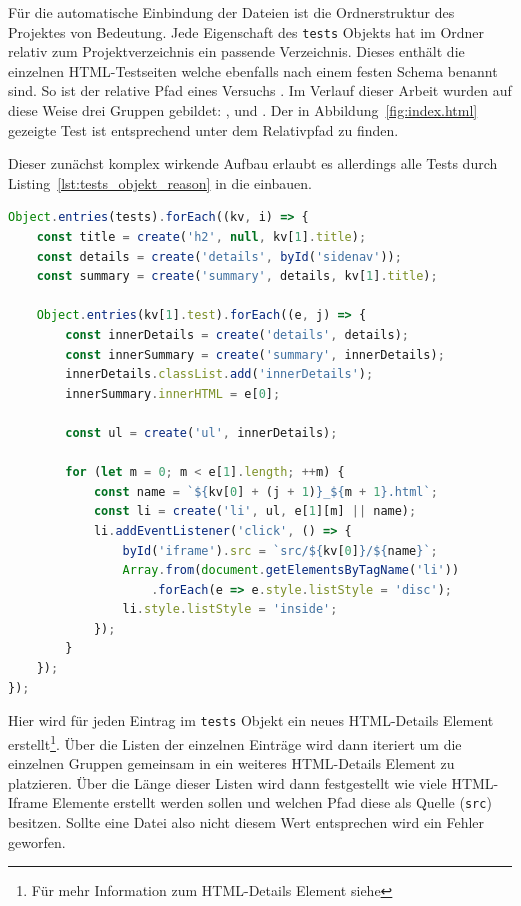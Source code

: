 Für die automatische Einbindung der Dateien ist die Ordnerstruktur des Projektes von Bedeutung.
Jede Eigenschaft des \lstinline{tests} Objekts hat im  Ordner relativ zum Projektverzeichnis ein passende Verzeichnis.
Dieses enthält die einzelnen HTML-Testseiten welche ebenfalls nach einem festen Schema benannt sind.
So ist der relative Pfad eines Versuchs .
Im Verlauf dieser Arbeit wurden auf diese Weise drei Gruppen gebildet: ,  und .
Der in Abbildung~\ref{fig:index.html} gezeigte Test ist entsprechend unter dem Relativpfad  zu finden.

Dieser zunächst komplex wirkende Aufbau erlaubt es allerdings alle Tests durch Listing~\ref{lst:tests_objekt_reason} in die  einbauen.

\begin{lstlisting}[language=JavaScript, caption={Iteration über das tests Objekt zur Population der index.html.}, label={lst:tests_objekt_reason}]
Object.entries(tests).forEach((kv, i) => {
    const title = create('h2', null, kv[1].title);
    const details = create('details', byId('sidenav'));
    const summary = create('summary', details, kv[1].title);

    Object.entries(kv[1].test).forEach((e, j) => {
        const innerDetails = create('details', details);
        const innerSummary = create('summary', innerDetails);
        innerDetails.classList.add('innerDetails');
        innerSummary.innerHTML = e[0];

        const ul = create('ul', innerDetails);

        for (let m = 0; m < e[1].length; ++m) {
            const name = `${kv[0] + (j + 1)}_${m + 1}.html`;
            const li = create('li', ul, e[1][m] || name);
            li.addEventListener('click', () => {
                byId('iframe').src = `src/${kv[0]}/${name}`;
                Array.from(document.getElementsByTagName('li'))
                    .forEach(e => e.style.listStyle = 'disc');
                li.style.listStyle = 'inside';
            });
        }
    });
});
\end{lstlisting}

Hier wird für jeden Eintrag im \lstinline{tests} Objekt ein neues HTML-Details Element erstellt\footnote{Für mehr Information zum HTML-Details Element siehe }.
Über die Listen der einzelnen Einträge wird dann iteriert um die einzelnen Gruppen gemeinsam in ein weiteres HTML-Details Element zu platzieren.
Über die Länge dieser Listen wird dann festgestellt wie viele HTML-Iframe Elemente erstellt werden sollen und welchen Pfad diese als Quelle (\lstinline{src}) besitzen.
Sollte eine Datei also nicht diesem Wert entsprechen wird ein Fehler geworfen.

